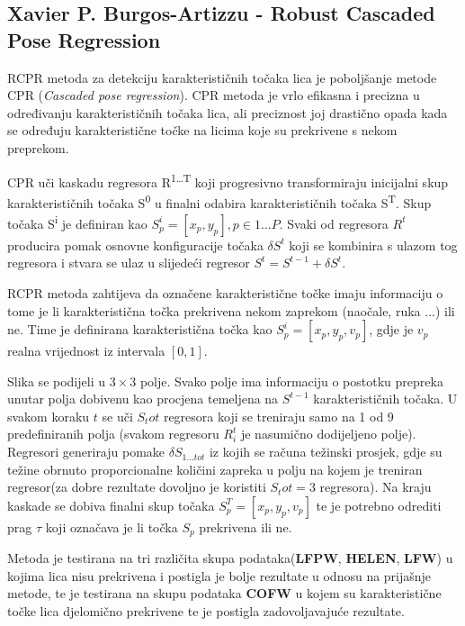 \subsection{Xavier P. Burgos-Artizzu - Robust Cascaded Pose Regression}
RCPR metoda za detekciju karakterističnih točaka lica je poboljšanje metode CPR (\textit{Cascaded pose regression}). CPR metoda je vrlo efikasna i precizna u određivanju karakterističnih točaka lica, ali preciznost joj drastično opada kada se određuju karakteristične točke na licima koje su prekrivene s nekom preprekom. 

CPR uči kaskadu regresora R\textsuperscript{1\ldots T} koji progresivno transformiraju inicijalni skup karakterističnih točaka S\textsuperscript{0} u finalni odabira karakterističnih točaka S\textsuperscript{T}. Skup točaka S\textsuperscript{i} je definiran kao $ S_p^i = [x_p, y_p], p \in 1\ldots P$. Svaki od regresora $R^t$ producira pomak osnovne konfiguracije točaka $ \delta S^t$ koji se kombinira s ulazom tog regresora i stvara se ulaz u slijedeći regresor $S^t = S^{t-1} + \delta S^t$. 

RCPR metoda zahtijeva da označene karakteristične točke imaju informaciju o tome je li karakteristična točka prekrivena nekom zaprekom (naočale, ruka ...) ili ne. Time je definirana karakteristična točka kao $S_p^i = [x_p, y_p, v_p]$, gdje je $v_p$ realna vrijednost iz intervala $[0, 1]$.

Slika se podijeli u $3 \times 3$ polje. Svako polje ima informaciju o postotku prepreka unutar polja dobivenu kao procjena temeljena na $S^{t-1}$ karakterističnih točaka. U svakom koraku $t$ se uči $S_tot$ regresora koji se treniraju samo na 1 od 9 predefiniranih polja (svakom regresoru $R_i^t$ je nasumično dodijeljeno polje). Regresori generiraju pomake $\delta S_{1\ldots tot}$ iz kojih se računa težinski prosjek, gdje su težine obrnuto proporcionalne količini zapreka u polju na kojem je treniran regresor(za dobre rezultate dovoljno je koristiti $S_tot = 3$ regresora). Na kraju kaskade se dobiva finalni skup točaka $S_p^T = [x_p, y_p, v_p]$ te je potrebno odrediti prag $\tau$ koji označava je li točka $S_p$ prekrivena ili ne.

Metoda je testirana na tri različita skupa podataka(\textbf{LFPW}, \textbf{HELEN}, \textbf{LFW}) u kojima lica nisu prekrivena i postigla je bolje rezultate u odnosu na prijašnje metode, te je testirana na skupu podataka \textbf{COFW} u kojem su karakteristične točke lica djelomično prekrivene te je postigla zadovoljavajuće  rezultate.